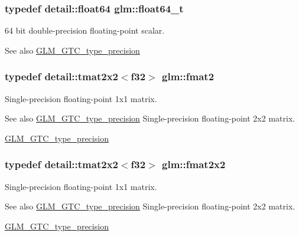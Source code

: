 \subsubsection[{float64\+\_\+t}]{\setlength{\rightskip}{0pt plus 5cm}typedef detail\+::float64 {\bf glm\+::float64\+\_\+t}}\label{group__gtc__type__precision_gade966a3eb25ebeb16dd53c40d3fdeb46}
64 bit double-\/precision floating-\/point scalar. \begin{DoxySeeAlso}{See also}
\hyperlink{group__gtc__type__precision}{G\+L\+M\+\_\+\+G\+T\+C\+\_\+type\+\_\+precision} 
\end{DoxySeeAlso}
\hypertarget{group__gtc__type__precision_ga3b3dcea3b5987db4744388ad0acf22a5}{}
\subsubsection[{fmat2}]{\setlength{\rightskip}{0pt plus 5cm}typedef detail\+::tmat2x2$<$f32$>$ {\bf glm\+::fmat2}}\label{group__gtc__type__precision_ga3b3dcea3b5987db4744388ad0acf22a5}
Single-\/precision floating-\/point 1x1 matrix. \begin{DoxySeeAlso}{See also}
\hyperlink{group__gtc__type__precision}{G\+L\+M\+\_\+\+G\+T\+C\+\_\+type\+\_\+precision} Single-\/precision floating-\/point 2x2 matrix. 

\hyperlink{group__gtc__type__precision}{G\+L\+M\+\_\+\+G\+T\+C\+\_\+type\+\_\+precision} 
\end{DoxySeeAlso}
\hypertarget{group__gtc__type__precision_ga36ec90579d358024a0609ae54c85c345}{}
\subsubsection[{fmat2x2}]{\setlength{\rightskip}{0pt plus 5cm}typedef detail\+::tmat2x2$<$f32$>$ {\bf glm\+::fmat2x2}}\label{group__gtc__type__precision_ga36ec90579d358024a0609ae54c85c345}
Single-\/precision floating-\/point 1x1 matrix. \begin{DoxySeeAlso}{See also}
\hyperlink{group__gtc__type__precision}{G\+L\+M\+\_\+\+G\+T\+C\+\_\+type\+\_\+precision} Single-\/precision floating-\/point 2x2 matrix. 

\hyperlink{group__gtc__type__precision}{G\+L\+M\+\_\+\+G\+T\+C\+\_\+type\+\_\+precision} 
\end{DoxySeeAlso}
\hypertarget{group__gtc__type__precision_ga962841878f2520a9ac2859bc2bd467fb}{}
